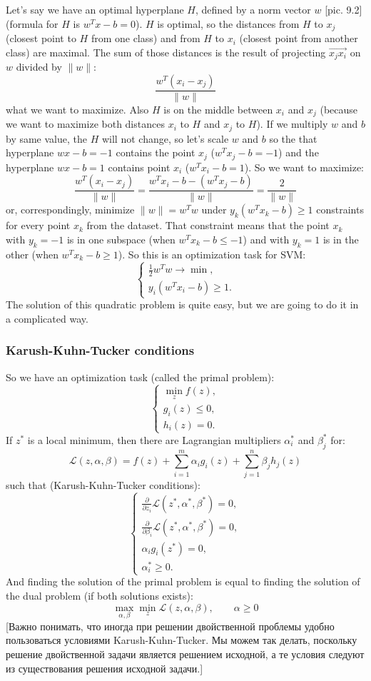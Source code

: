Let's say we have an optimal hyperplane $H$, defined by a norm vector $w$ [pic. 9.2] (formula for $H$ is $w^Tx-b=0$). $H$ is optimal, so the distances from $H$ to $x_j$ (closest point to $H$ from one class) and from $H$ to $x_i$ (closest point from another class) are maximal. The sum of those distances is the result of projecting $\overrightarrow{x_jx_i}$ on $w$ divided by $\|w\|$:
$$\frac{w^T(x_i-x_j)}{\|w\|}$$
what we want to maximize. Also $H$ is on the middle between $x_i$ and $x_j$ (because we want to maximize both distances $x_i$ to $H$ and $x_j$ to $H$). If we multiply $w$ and $b$ by same value, the $H$ will not change, so let's scale $w$ and $b$ so the that hyperplane $wx-b=-1$ contains the point $x_j$ ($w^Tx_j-b=-1$) and the hyperplane $wx-b=1$ contains point $x_i$ ($w^Tx_i-b=1$). So we want to maximize:
$$\frac{w^T(x_i-x_j)}{\|w\|}=\frac{w^Tx_i-b-(w^Tx_j-b)}{\|w\|}=\frac{2}{\|w\|}$$
or, correspondingly, minimize $\|w\|=w^Tw$ under $y_k(w^Tx_k-b)\ge 1$ constraints for every point $x_k$ from the dataset. That constraint means that the point $x_k$ with $y_k=-1$ is in one subspace (when $w^Tx_k-b\le-1$) and with $y_k=1$ is in the other (when $w^Tx_k-b\ge1$). So this is an optimization task for SVM:
$$\begin{cases}
	\frac{1}{2}w^Tw\to\min, \\
	y_i(w^Tx_i-b)\ge1.
\end{cases}$$
The solution of this quadratic problem is quite easy, but we are going to do it in a complicated way.

\subsubsection*{Karush-Kuhn-Tucker conditions}

So we have an optimization task (called the primal problem):
$$\begin{cases}
	\min\limits_{z}f(z), \\
	g_i(z)\le0, \\
	h_i(z)=0.
\end{cases}$$
If $z^*$ is a local minimum, then there are Lagrangian multipliers $\alpha_i^*$ and $\beta_j^*$ for:
$$\mathcal{L}(z,\alpha,\beta)=f(z)+\sum\limits_{i=1}^{m}\alpha_i g_i(z)+\sum\limits_{j=1}^{n}\beta_jh_j(z)$$
such that (Karush-Kuhn-Tucker conditions):
$$\begin{cases}
	\frac{\partial}{\partial z_i}\mathcal{L}(z^*,\alpha^*,\beta^*)=0, \\
	\frac{\partial}{\partial \beta_i}\mathcal{L}(z^*,\alpha^*,\beta^*)=0, \\
	\alpha_i g_i(z^*)=0, \\
	\alpha_i^*\ge0.
\end{cases}$$
And finding the solution of the primal problem is equal to finding the solution of the dual problem (if both solutions exists):
$$\max\limits_{\alpha,\beta}\min\limits_{z}\mathcal{L}(z,\alpha,\beta),\qquad\alpha\ge0$$
[Важно понимать, что иногда при решении двойственной проблемы удобно пользоваться условиями Karush-Kuhn-Tucker. Мы можем так делать, поскольку решение двойственной задачи является решением исходной, а те условия следуют из существования решения исходной задачи.]

